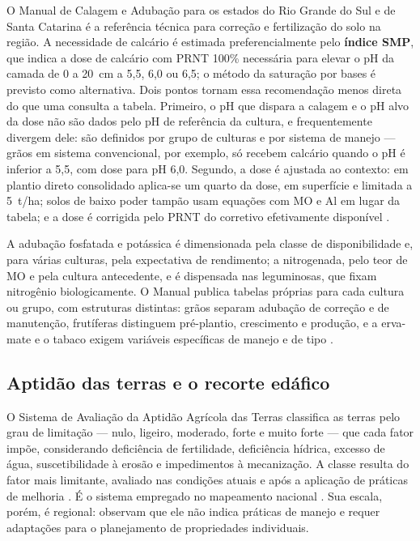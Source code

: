 O Manual de Calagem e Adubação para os estados do Rio Grande do Sul e de Santa Catarina
\citep{ManualCalagem2016} é a referência técnica para correção e fertilização do solo na
região. A necessidade de calcário é estimada preferencialmente pelo \textbf{índice SMP}, que
indica a dose de calcário com PRNT 100\% necessária para elevar o pH da camada de 0 a 20~cm a
5,5, 6,0 ou 6,5; o método da saturação por bases é previsto como alternativa. Dois pontos
tornam essa recomendação menos direta do que uma consulta a tabela. Primeiro, o pH que dispara
a calagem e o pH alvo da dose não são dados pelo pH de referência da cultura, e frequentemente
divergem dele: são definidos por grupo de culturas e por sistema de manejo --- grãos em sistema convencional, por exemplo, só recebem
calcário quando o pH é inferior a 5,5, com dose para pH 6,0. Segundo, a dose é ajustada ao
contexto: em plantio direto consolidado aplica-se um quarto da dose, em superfície e limitada
a 5~t/ha; solos de baixo poder tampão usam equações com MO e Al em lugar da tabela; e a dose
é corrigida pelo PRNT do corretivo efetivamente disponível \citep{ManualCalagem2016}.

A adubação fosfatada e potássica é dimensionada pela classe de disponibilidade e, para várias
culturas, pela expectativa de rendimento; a nitrogenada, pelo teor de MO e pela cultura
antecedente, e é dispensada nas leguminosas, que fixam nitrogênio biologicamente. O Manual
publica tabelas próprias para cada cultura ou grupo, com estruturas distintas: grãos separam
adubação de correção e de manutenção, frutíferas distinguem pré-plantio, crescimento e
produção, e a erva-mate e o tabaco exigem variáveis específicas de manejo e de tipo
\citep{ManualCalagem2016}.

\subsection{Aptidão das terras e o recorte edáfico}\label{sec:rev_aptidao}

O Sistema de Avaliação da Aptidão Agrícola das Terras \citep{RamalhoFilhoBeek1995} classifica
as terras pelo grau de limitação --- nulo, ligeiro, moderado, forte e muito forte --- que cada
fator impõe, considerando deficiência de fertilidade, deficiência hídrica, excesso de água,
suscetibilidade à erosão e impedimentos à mecanização. A classe resulta do fator mais
limitante, avaliado nas condições atuais e após a aplicação de práticas de melhoria
\citep{Hofig2015}. É o sistema empregado no mapeamento nacional \citep{EmbrapaAptidao2025}.
Sua escala, porém, é regional: \cite{Hofig2015} observam que ele não indica práticas de manejo
e requer adaptações para o planejamento de propriedades individuais.

